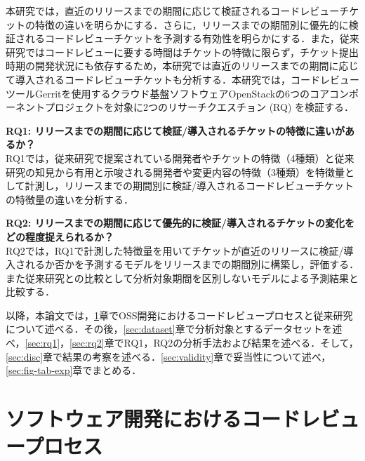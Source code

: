 \documentclass[T,J]{fose} %
\newcommand{\todo}[1]{\colorbox{yellow}{{\bf TODO}:}{\color{red} {\textbf{[#1]}}}}
\newcommand{\change}[1]{\colorbox{green}{{\bf CHANGE}:}{\color{black} {\textbf{[#1]}}}}
\newcommand{\rqone}{リリースまでの期間に応じて検証/導入されるチケットの特徴に違いがあるか？}
\newcommand{\rqtwo}{リリースまでの期間に応じて優先的に検証/導入されるチケットの変化をどの程度捉えられるか？}
\newcommand{\rqthree}{\todo{rq}}
\begin{document}
本研究では，直近のリリースまでの期間に応じて検証されるコードレビューチケットの特徴の違いを明らかにする．さらに，リリースまでの期間別に優先的に検証されるコードレビューチケットを予測する有効性を明らかにする．また，従来研究\cite{estimate_merge_time}ではコードレビューに要する時間はチケットの特徴に限らず，チケット提出時期の開発状況にも依存するため，本研究では直近のリリースまでの期間に応じて導入されるコードレビューチケットも分析する．本研究では，コードレビューツールGerritを使用するクラウド基盤ソフトウェアOpenStackの6つのコアコンポーネントプロジェクトを対象に2つのリサーチクエスチョン (RQ) を検証する．

\noindent\textbf{RQ1: \rqone}\\
RQ1では，従来研究\cite{prioritizer}で提案されている開発者やチケットの特徴（4種類）と従来研究\cite{review1}\cite{release_merge}の知見から有用と示唆される開発者や変更内容の特徴（3種類）を特徴量として計測し，リリースまでの期間別に検証/導入されるコードレビューチケットの特徴量の違いを分析する．

\noindent\textbf{RQ2: \rqtwo}\\
RQ2では，RQ1で計測した特徴量を用いてチケットが直近のリリースに検証/導入されるか否かを予測するモデルをリリースまでの期間別に構築し，評価する．また従来研究との比較として分析対象期間を区別しないモデルによる予測結果と比較する．


以降，本論文では，\ref{sec:intro}章でOSS開発におけるコードレビュープロセスと従来研究について述べる．その後，\ref{sec:dataset}章で分析対象とするデータセットを述べ，\ref{sec:rq1}，\ref{sec:rq2}章でRQ1，RQ2の分析手法および結果を述べる．そして，\ref{sec:disc}章で結果の考察を述べる．\ref{sec:validity}章で妥当性について述べ，\ref{sec:fig-tab-exp}章でまとめる．

\section{ソフトウェア開発におけるコードレビュープロセス}\label{sec:intro}
\end{document}
